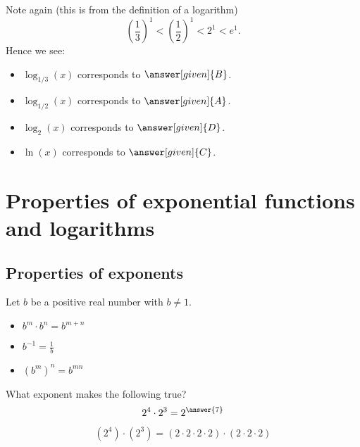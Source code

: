 \documentclass{ximera}
\begin{document}
\begin{example}
\begin{explanation}
\begin{image}
    \end{image}
    Note again (this is from the definition of a logarithm)
    \[
    \left(\frac{1}{3}\right)^1 < \left(\frac{1}{2}\right)^1  < 2^1 < e^1.
    \]
    Hence we see:
    \begin{itemize}
    \item $\log_{1/3}(x)$ corresponds to $\answer[given]{B}$.
    \item $\log_{1/2}(x)$ corresponds to $\answer[given]{A}$.
    \item $\log_2(x)$ corresponds to $\answer[given]{D}$.
    \item $\ln(x)$ corresponds to $\answer[given]{C}$.
    \end{itemize}
  \end{explanation}
\end{example}



\section{Properties of exponential functions and logarithms}

\subsection{Properties of exponents}
Let $b$ be a positive real number with $b\ne 1$.
\begin{itemize}
  \item $b^m\cdot b^n = b^{m+n}$
  \item $b^{-1} = \frac{1}{b}$
  \item $\left(b^m\right)^n = b^{mn}$
\end{itemize}
\begin{question}
  What exponent makes the following true?
  \[
  2^4 \cdot 2^3 = 2^{\answer{7}}
  \]
  \begin{hint}
    \[
    (2^4) \cdot (2^3) = (2 \cdot 2\cdot 2 \cdot 2) \cdot  (2 \cdot 2\cdot 2)
    \]
  \end{hint}
\end{question}
\end{document}
